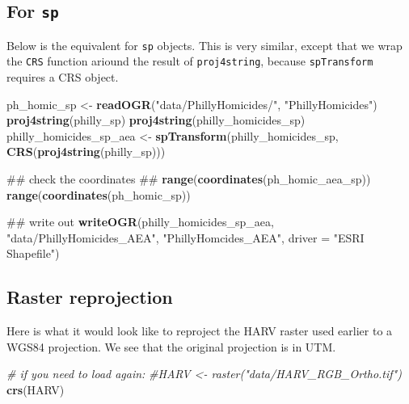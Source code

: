 \documentclass[]{book}
\newenvironment{Shaded}{\begin{snugshade}}{\end{snugshade}}
\newcommand{\KeywordTok}[1]{\textcolor[rgb]{0.13,0.29,0.53}{\textbf{#1}}}
\newcommand{\DataTypeTok}[1]{\textcolor[rgb]{0.13,0.29,0.53}{#1}}
\newcommand{\StringTok}[1]{\textcolor[rgb]{0.31,0.60,0.02}{#1}}
\newcommand{\CommentTok}[1]{\textcolor[rgb]{0.56,0.35,0.01}{\textit{#1}}}
\newcommand{\NormalTok}[1]{#1}
\begin{document}
\subsection{\texorpdfstring{For \texttt{sp}}{For sp}}\label{for-sp}

Below is the equivalent for \texttt{sp} objects. This is very similar,
except that we wrap the \texttt{CRS} function ariound the result of
\texttt{proj4string}, because \texttt{spTransform} requires a CRS
object.

\begin{Shaded}
\begin{Highlighting}[]
\NormalTok{ph_homic_sp <-}\StringTok{ }\KeywordTok{readOGR}\NormalTok{(}\StringTok{"data/PhillyHomicides/"}\NormalTok{, }\StringTok{"PhillyHomicides"}\NormalTok{)}
\KeywordTok{proj4string}\NormalTok{(philly_sp)}
\KeywordTok{proj4string}\NormalTok{(philly_homicides_sp)}
\NormalTok{philly_homicides_sp_aea <-}\StringTok{ }\KeywordTok{spTransform}\NormalTok{(philly_homicides_sp, }\KeywordTok{CRS}\NormalTok{(}\KeywordTok{proj4string}\NormalTok{(philly_sp)))}

\NormalTok{## check the coordinates ##}
\KeywordTok{range}\NormalTok{(}\KeywordTok{coordinates}\NormalTok{(ph_homic_aea_sp))}
\KeywordTok{range}\NormalTok{(}\KeywordTok{coordinates}\NormalTok{(ph_homic_sp))}

\NormalTok{## write out}
\KeywordTok{writeOGR}\NormalTok{(philly_homicides_sp_aea, }\StringTok{"data/PhillyHomicides_AEA"}\NormalTok{, }\StringTok{"PhillyHomcides_AEA"}\NormalTok{, }\DataTypeTok{driver =} \StringTok{"ESRI Shapefile"}\NormalTok{)}
\end{Highlighting}
\end{Shaded}

\subsection{Raster reprojection}\label{raster-reprojection}

Here is what it would look like to reproject the HARV raster used
earlier to a WGS84 projection. We see that the original projection is in
UTM.

\begin{Shaded}
\begin{Highlighting}[]
\CommentTok{# if you need to load again:}
\CommentTok{#HARV <- raster("data/HARV_RGB_Ortho.tif")}
\KeywordTok{crs}\NormalTok{(HARV)}
\end{Highlighting}
\end{Shaded}
\end{document}
